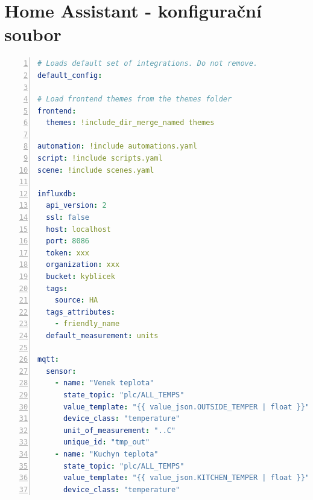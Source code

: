 \chapter{Home Assistant - konfigurační soubor}
\label{apend:configyaml}
\begin{lstlisting}[language=YAML, breaklines=true, numbers=left, numberstyle=\small, numbersep=10pt, frame=single, basicstyle=\ttfamily\small, caption={Home Assistant configuration.yaml}, label={lst:configyaml}]
# Loads default set of integrations. Do not remove.            
default_config:

# Load frontend themes from the themes folder                  
frontend:                                                      
  themes: !include_dir_merge_named themes

automation: !include automations.yaml
script: !include scripts.yaml                    
scene: !include scenes.yaml                                    

influxdb:
  api_version: 2           
  ssl: false
  host: localhost                                              
  port: 8086                                                   
  token: xxx
  organization: xxx                                
  bucket: kyblicek                                             
  tags:                                                        
    source: HA                                                 
  tags_attributes:                                              
    - friendly_name                                             
  default_measurement: units                                   

mqtt:
  sensor:
    - name: "Venek teplota"
      state_topic: "plc/ALL_TEMPS"
      value_template: "{{ value_json.OUTSIDE_TEMPER | float }}"
      device_class: "temperature"
      unit_of_measurement: "..C"
      unique_id: "tmp_out"
    - name: "Kuchyn teplota"
      state_topic: "plc/ALL_TEMPS"                             
      value_template: "{{ value_json.KITCHEN_TEMPER | float }}"
      device_class: "temperature"
\end{lstlisting}
\pagebreak
